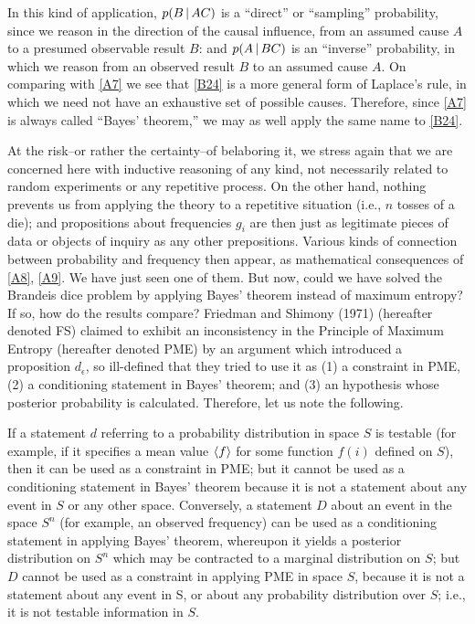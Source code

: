 In this kind of application, $p(B\,\vert\, AC)$ is a ``direct'' or ``sampling'' probability, since we reason in the direction of the causal influence, from an assumed cause $A$ to a presumed observable result $B$: and $p(A\,\vert\, BC)$ is an ``inverse'' probability, in which we reason from an observed result $B$ to an assumed cause $A$.
On comparing with \eqref{A7} we see that \eqref{B24} is a more general form of Laplace's rule, in which we need not have an exhaustive set of possible causes.
Therefore, since \eqref{A7} is always called ``Bayes' theorem,'' we may as well apply the same name to \eqref{B24}.

At the risk--or rather the certainty--of belaboring it, we stress again that we are concerned here with inductive reasoning of any kind, not necessarily related to random experiments or any repetitive process.
On the other hand, nothing prevents us from applying the theory to a repetitive situation (i.e., $n$ tosses of a die); and propositions about frequencies $g_i$ are then just as legitimate pieces of data or objects of inquiry as any other prepositions.
Various kinds of connection between probability and frequency then appear, as mathematical consequences of \eqref{A8}, \eqref{A9}.
We have just seen one of them.
But now, could we have solved the Brandeis dice problem by applying Bayes' theorem instead of maximum entropy?
If so, how do the results compare? Friedman and Shimony (\cite{friedman}{1971}) (hereafter denoted \cite{friedman}{FS}) claimed to exhibit an inconsistency in the Principle of Maximum Entropy (hereafter denoted PME) by an argument which introduced a proposition $d_\epsilon$, so ill-defined that they tried to use it as
(1) a constraint in PME,
(2) a conditioning statement in Bayes’ theorem; and
(3) an hypothesis whose posterior probability is calculated.
Therefore, let us note the following.

If a statement $d$ referring to a probability distribution in space $S$ is testable (for example, if it specifies a mean value $\langle f\rangle$ for some function $f(i)$ defined on $S$), then it can be used as a constraint in PME; but it cannot be used as a conditioning statement in Bayes' theorem because it is not a statement about any event in $S$ or any other space.
Conversely, a statement $D$ about an event in the space $S^n$ (for example, an observed frequency) can be used as a conditioning statement in applying Bayes' theorem, whereupon it yields a posterior distribution on $S^n$ which may be contracted to a marginal distribution on $S$; but $D$ cannot be used as a constraint in applying PME in space $S$, because it is not a statement about any event in S, or about any probability distribution over $S$; i.e., it is not testable information in $S$.

